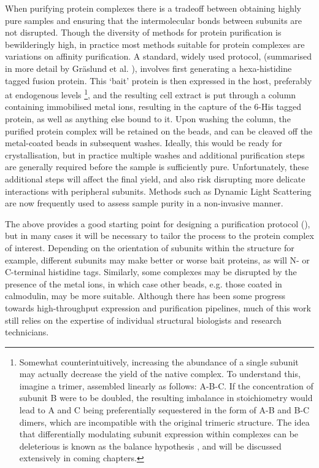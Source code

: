 \documentclass[a4paper,11pt,twoside,openright]{scrbook}
\begin{document}
When purifying protein complexes there is a tradeoff between obtaining highly pure samples and ensuring that the intermolecular bonds between subunits are not disrupted. Though the diversity of methods for protein purification is bewilderingly high, in practice most methods suitable for protein complexes are variations on affinity purification. A standard, widely used protocol, (summarised in more detail by Gr{\"a}slund et al. \cite{Graslund2008}), involves first generating a hexa-histidine tagged fusion protein. This `bait' protein is then expressed in the host, preferably at endogenous levels
\footnote{Somewhat counterintuitively, increasing the abundance of a single subunit may actually decrease the yield of the native complex. To understand this, imagine a trimer, assembled linearly as follows: A-B-C. If the concentration of subunit B were to be doubled, the resulting imbalance in stoichiometry would lead to A and C being preferentially sequestered in the form of A-B and B-C dimers, which are incompatible with the original trimeric structure. The idea that differentially modulating subunit expression within complexes can be deleterious is known as the balance hypothesis \cite{Papp2003}, and will be discussed extensively in coming chapters.},
and the resulting cell extract is put through a column containing immobilised metal ions, resulting in the capture of the 6-His tagged protein, as well as anything else bound to it. Upon washing the column, the purified protein complex will be retained on the beads, and can be cleaved off the metal-coated beads in subsequent washes. Ideally, this would be ready for crystallisation, but in practice multiple washes and additional purification steps are generally required before the sample is sufficiently pure. Unfortunately, these additional steps will affect the final yield, and also risk disrupting more delicate interactions with peripheral subunits. Methods such as Dynamic Light Scattering are now frequently used to assess sample purity in a non-invasive manner.

The above provides a good starting point for designing a purification protocol (), but in many cases it will be necessary to tailor the process to the protein complex of interest. Depending on the orientation of subunits within the structure for example, different subunits may make better or worse bait proteins, as will N- or C-terminal histidine tags. Similarly, some complexes may be disrupted by the presence of the metal ions, in which case other beads, e.g. those coated in calmodulin, may be more suitable. Although there has been some progress towards high-throughput expression and purification pipelines, much of this work still relies on the expertise of individual structural biologists and research technicians.
\end{document}
